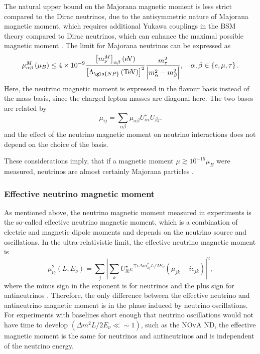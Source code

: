 The natural upper bound on the Majorana magnetic moment is less strict compared to the Dirac neutrinos, due to the antisymmetric nature of Majorana magnetic moment, which requires additional Yukawa couplings in the \gls{BSM} theory compared to Dirac neutrinos, which can enhance the maximal possible magnetic moment \cite{nuMMMajoranaBounds2006.pdf}. The limit for Majorana neutrinos can be expressed as
\begin{equation}
\mu_{\alpha\beta}^M\left(\mu_B\right)\leq 4\times 10^{-9}\frac{\left[m_\nu^M\right]_{\alpha\beta}\left(\unit{eV}\right)}{\left[\Lambda_{\gls{NP}}\left(\unit{TeV}\right)\right]^2}\frac{m_\tau^2}{\left|m_\alpha^2-m_\beta^2\right|},\ \ \ \alpha,\beta\in\left\lbrace e,\mu,\tau\right\rbrace.
\end{equation}
Here, the neutrino magnetic moment is expressed in the flavour basis instead of the mass basis, since the charged lepton masses are diagonal here. The two bases are related by
\begin{equation}
\mu_{ij}=\sum_{\alpha\beta}\mu_{\alpha\beta}U^{\star}_{\alpha i}U_{\beta j}.
\end{equation}
and the effect of the neutrino magnetic moment on neutrino interactions does not depend on the choice of the  basis\cite{Gonzalez-GarciaPhenomenologyMassiveNu.pdf}.

These considerations imply, that if a magnetic moment $\mu\gtrsim 10^{-15}\mu_B$ were measured, neutrinos are almost certainly Majorana particles \cite{nuMMMajoranaBounds2006.pdf}.

\subsubsection{Effective neutrino magnetic moment}
As mentioned above, the neutrino magnetic moment measured in experiments is the so-called effective neutrino magnetic moment, which is a combination of electric and magnetic dipole moments and depends on the neutrino source and oscillations. In the ultra-relativistic limit, the effective neutrino magnetic moment is
\begin{equation}
\mu_{\nu_l}^2\left(L,E_{\nu}\right)=\sum_j\left|\sum_k U^{\star}_{lk}e^{\mp i\Delta m^2_{kj}L/2E_{\nu}}\left(\mu_{jk}-i\epsilon_{jk}\right)\right|^2,
\end{equation}
where the minus sign in the exponent is for neutrinos and the plus sign for antineutrinos \cite{nuElmagInt2015.pdf}. Therefore, the only difference between the effective neutrino and antineutrino magnetic moment is in the phase induced by neutrino oscillations. For experiments with baselines short enough that neutrino oscillations would not have time to develop $\left(\Delta m^2L/2E_{\nu}\ll\sim1\right)$, such as the \gls{NOvA} \gls{ND}, the effective magnetic moment is the same for neutrinos and antineutrinos and is independent of the neutrino energy.

